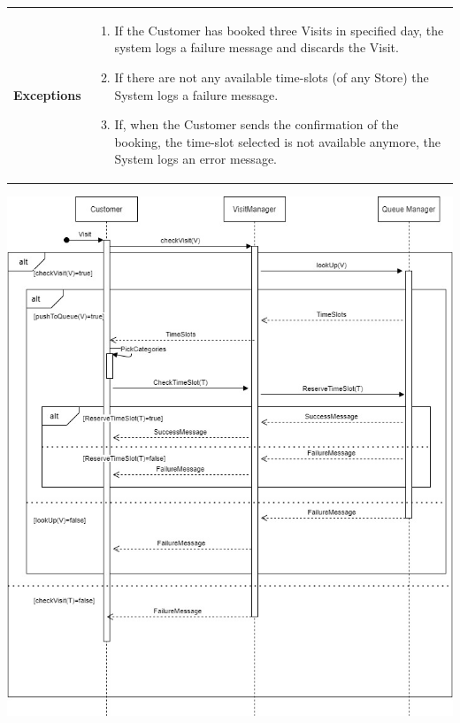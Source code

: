 \documentclass[a4paper, 12pt, oneside]{article}
\begin{document}
\begin{enumerate}[labelindent=20pt, label={UC.\arabic*}, itemindent=1em,leftmargin=!]
\begin{tabularx}{\linewidth}{| l | X |}
	\hline
	\textbf{Exceptions} & \parbox{0.7\textwidth}{ \begin{enumerate}
			\item If the Customer has booked three Visits in specified day, the system logs a failure message and discards the Visit.
			\item If there are not any available time-slots (of any Store) the System logs a failure message.
			\item If, when the Customer sends the confirmation of the booking, the time-slot selected is not available anymore, the System logs an error message.
		\end{enumerate}}\\

	\hline
	
\end{tabularx}

\begin{minipage}{\linewidth}
            \centering
           \includegraphics[height=0.5\textheight, scale=1, keepaspectratio]{img/seq_diag/GetVisitD.jpg}
\end{minipage}


\end{enumerate}
\end{document}
